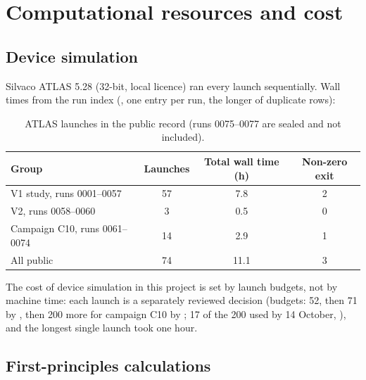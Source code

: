 \chapter{Computational resources and cost}
\label{app:mono-resources}

\section{Device simulation}
\label{sec:mono-res-atlas}

Silvaco ATLAS 5.28 (32-bit, local licence) ran every launch sequentially. Wall times from the run index
(, one entry per run, the longer of duplicate rows):

\begin{table}[htbp]\centering\small
\caption{ATLAS launches in the public record (runs 0075--0077 are sealed and not included).}
\label{tab:mono-res-atlas}
\begin{tabular}{lccc}\toprule
Group & Launches & Total wall time (h) & Non-zero exit \\\midrule
V1 study, runs 0001--0057 & 57 & 7.8 & 2 \\
V2, runs 0058--0060 & 3 & 0.5 & 0 \\
Campaign C10, runs 0061--0074 & 14 & 2.9 & 1 \\
All public & 74 & 11.1 & 3 \\\bottomrule
\end{tabular}
\end{table}

The cost of device simulation in this project is set by launch budgets, not by machine time: each launch is a separately
reviewed decision (budgets: 52, then 71 by , then 200 more for campaign C10 by ; 17 of the 200 used
by 14 October, ), and the longest single launch took one hour.

\section{First-principles calculations}
\label{sec:mono-res-dft}

